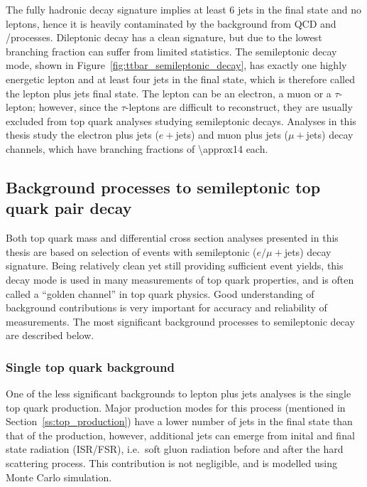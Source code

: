 The fully hadronic \ttbar decay signature implies at least 6 jets in the final state and no leptons, hence it is heavily
contaminated by the background from QCD and \W/\ZpJets processes. Dileptonic \ttbar decay has a clean signature, but due
to the lowest branching fraction can suffer from limited statistics. The semileptonic decay mode, shown in
Figure~\ref{fig:ttbar_semileptonic_decay}, has exactly one highly energetic lepton and at least four jets in the final
state, which is therefore called the lepton plus jets final state. The lepton can be an electron, a muon or a
$\tau$-lepton; however, since the $\tau$-leptons are difficult to reconstruct, they are usually excluded from top quark
analyses studying semileptonic decays. Analyses in this thesis study the electron plus jets ($e+$jets) and muon plus
jets ($\mu+$jets) decay channels, which have branching fractions of \SI{\approx14}{\pc} each.



\newpage
\subsection{Background processes to semileptonic top quark pair decay}
\label{ss:backgrounds}
Both top quark mass and differential cross section analyses presented in this thesis are based on selection of events
with semileptonic ($e/\mu+$jets) \ttbar decay signature. Being relatively clean yet still providing sufficient event
yields, this decay mode is used in many measurements of top quark properties, and is often called a ``golden channel''
in top quark physics. Good understanding of background contributions is very important for accuracy and reliability of
measurements. The most significant background processes to semileptonic \ttbar decay are described below.

\subsubsection*{Single top quark background}
One of the less significant backgrounds to lepton plus jets analyses is the single top quark production. Major
production modes for this process (mentioned in Section~\ref{ss:top_production}) have a lower number of jets in the
final state than that of the \ttbar production, however, additional jets can emerge from inital and final state
radiation (ISR/FSR), i.e.\ soft gluon radiation before and after the hard scattering process. This contribution is not
negligible, and is modelled using Monte Carlo simulation.

